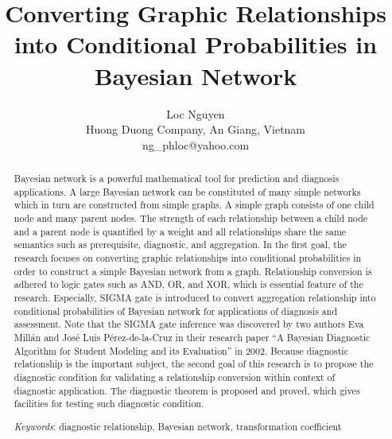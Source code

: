 \documentclass{article}
\begin{document}
\title{Converting Graphic Relationships into Conditional Probabilities in Bayesian Network}

\author{
Loc Nguyen\\
Huong Duong Company, An Giang, Vietnam\\
ng\_phloc@yahoo.com
}

\maketitle

\begin{abstract}
Bayesian network is a powerful mathematical tool for prediction and diagnosis applications. A large Bayesian network can be constituted of many simple networks which in turn are constructed from simple graphs. A simple graph consists of one child node and many parent nodes. The strength of each relationship between a child node and a parent node is quantified by a weight and all relationships share the same semantics such as prerequisite, diagnostic, and aggregation. In the first goal, the research focuses on converting graphic relationships into conditional probabilities in order to construct a simple Bayesian network from a graph. Relationship conversion is adhered to logic gates such as AND, OR, and XOR, which is essential feature of the research. Especially, SIGMA gate is introduced to convert aggregation relationship into conditional probabilities of Bayesian network for applications of diagnosis and assessment. Note that the SIGMA gate inference was discovered by two authors Eva Millán and José Luis Pérez-de-la-Cruz in their research paper ``A Bayesian Diagnostic Algorithm for Student Modeling and its Evaluation'' in 2002. Because diagnostic relationship is the important subject, the second goal of this research is to propose the diagnostic condition for validating a relationship conversion within context of diagnostic application. The diagnostic theorem is proposed and proved, which gives facilities for testing such diagnostic condition.

\textit{Keywords}: diagnostic relationship, Bayesian network, transformation coefficient
\end{abstract}
\end{document}
